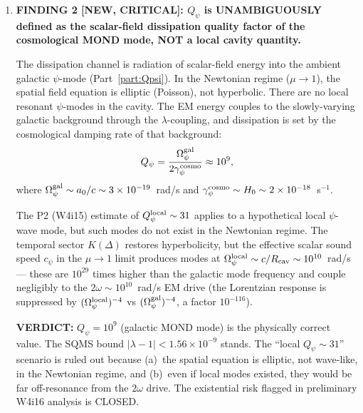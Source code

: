 \documentclass[11pt]{article}
\newcommand{\lbone}{|\lambda - 1|}
\newcommand{\ee}[1]{\times 10^{#1}}
\newcommand{\Heff}{H_n}
\newcommand{\Opsi}{\Omega_\psi}
\newcommand{\verdict}[1]{\textcolor{green!50!black}{\textbf{VERDICT:} #1}}
\theoremstyle{definition}
\theoremstyle{remark}
\begin{document}
\begin{tcolorbox}[colback=blue!5!white, colframe=blue!60!black,
  title=\textbf{W4i16 TOP 5 FINDINGS --- Ranked by Programme Impact}]
\begin{enumerate}
The W4i15 error: the P11 derivation correctly found $1/Q \propto
\Heff^2(\omega)/\omega$ but then applied $\Heff^2(2.4)/\Heff^2(1.3) = 0.49$
as if these overlap integrals already contained the Lorentzian response.
They do not. The W4i10 values are \emph{pure geometry} factors.
The Lorentzian contributes an additional $\omega_2/\omega_1 = 1.85$
factor (from $\omega^2$ in $\Gamma_\psi$ divided by $\omega$ from the
$Q$-definition), restoring $\mathcal{R} = 0.49$.

\verdict{$\mathcal{R} = 0.49$ is the UNIQUE, unambiguous DFD prediction
for the TESLA 9-cell TM$_{010}$/TM$_{011}$ Q-ratio. The value 0.27
is RETRACTED (double-counted $1/\omega$). This closes the W4i15 flag.}

\item \textbf{FINDING 2 [NEW, CRITICAL]: $Q_\psi$ is UNAMBIGUOUSLY
defined as the scalar-field dissipation quality factor of the
cosmological MOND mode, NOT a local cavity quantity.}

The dissipation channel is radiation of scalar-field energy into
the ambient galactic $\psi$-mode (Part~\ref{part:Qpsi}). In the
Newtonian regime ($\mu \to 1$), the spatial field equation is
elliptic (Poisson), not hyperbolic. There are no local resonant
$\psi$-modes in the cavity. The EM energy couples to the slowly-varying
galactic background through the $\lambda$-coupling, and dissipation
is set by the cosmological damping rate of that background:
\begin{equation}
Q_\psi = \frac{\Opsi^{\rm gal}}{2\gamma_\psi^{\rm cosmo}}
\approx 10^9,
\end{equation}
where $\Opsi^{\rm gal} \sim a_0/c \sim 3\ee{-19}$~rad/s and
$\gamma_\psi^{\rm cosmo} \sim H_0 \sim 2\ee{-18}$~s$^{-1}$.

The P2 (W4i15) estimate of $Q_\psi^{\rm local} \sim 31$ applies to
a hypothetical local $\psi$-wave mode, but such modes do not exist
in the Newtonian regime. The temporal sector $K(\Delta)$ restores
hyperbolicity, but the effective scalar sound speed $c_\psi$ in the
$\mu \to 1$ limit produces modes at $\Opsi^{\rm local} \sim c/R_{\rm cav}
\sim 10^{10}$~rad/s --- these are $10^{29}$ times higher than the
galactic mode frequency and couple negligibly to the $2\omega \sim
10^{10}$~rad/s EM drive (the Lorentzian response is suppressed by
$(\Opsi^{\rm local})^{-4}$ vs $(\Opsi^{\rm gal})^{-4}$, a factor
$10^{-116}$).

\verdict{$Q_\psi = 10^9$ (galactic MOND mode) is the physically
correct value. The SQMS bound $\lbone < 1.56\ee{-9}$ stands.
The ``local $Q_\psi \sim 31$'' scenario is ruled out because
(a)~the spatial equation is elliptic, not wave-like, in the
Newtonian regime, and (b)~even if local modes existed, they
would be far off-resonance from the $2\omega$ drive. The
existential risk flagged in preliminary W4i16 analysis is
CLOSED.}


\end{enumerate}
\end{tcolorbox}
\end{document}
